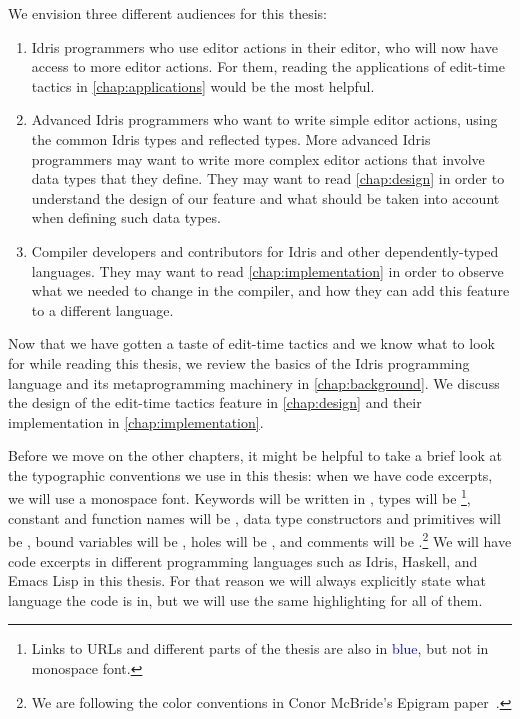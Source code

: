 We envision three different audiences for this thesis:
\begin{enumerate}[(1)]
\item Idris programmers who use editor actions in their editor, who will now
  have access to more editor actions. For them, reading the applications of
edit-time tactics in \autoref{chap:applications} would be the most helpful.
\item Advanced Idris programmers who want to write simple editor actions, using
  the common Idris types and reflected types. More advanced Idris programmers
    may want to write more complex editor actions that involve data types
    that they define.
    They may want to read \autoref{chap:design} in order to understand the
    design of our feature and what should be taken into account when defining
    such data types.
\item Compiler developers and contributors for Idris and other
  dependently-typed languages.  They may want to read
    \autoref{chap:implementation} in order to observe what we needed to change
    in the compiler, and how they can add this feature to a different language.
\end{enumerate}

Now that we have gotten a taste of edit-time tactics and we know what to look
for while reading this thesis, we review the basics of the Idris
programming language and its metaprogramming machinery in
\autoref{chap:background}.
We discuss the design of the edit-time tactics feature in
\autoref{chap:design} and their implementation in
\autoref{chap:implementation}.

Before we move on the other chapters, it might be helpful to take a brief look
at the typographic conventions we use in this thesis: when we have code
excerpts, we will use a monospace font.  Keywords will be written in , types will be \footnote{Links to URLs and different parts
of the thesis are also in \textcolor{blue}{blue}, but not in monospace font.},
constant and function names will be
, data type constructors and primitives will be , bound
variables will be , holes will be
\texttt{}, and comments will be
.\footnote{We are following the color conventions in Conor McBride's
Epigram paper~\cite{epigram}.} We will have code excerpts in different
programming languages such as Idris, Haskell, and Emacs Lisp in this thesis.
For that reason we will always explicitly state what language the code is in,
but we will use the same highlighting for all of them.
